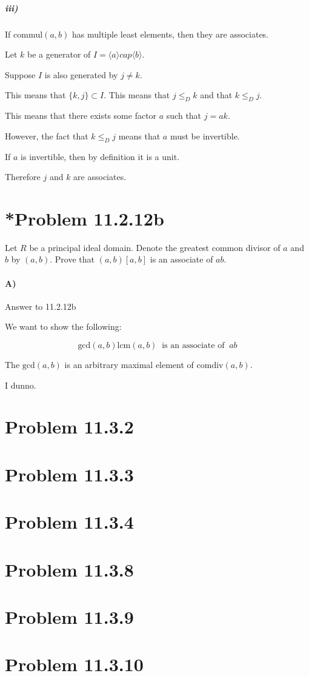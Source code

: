 \documentclass[10pt,letter]{article}
\begin{document}
\subparagraph{iii)} If $\text{commul}(a, b)$ has multiple least elements, then they are associates.

Let $k$ be a generator of $I = \langle a \rangle cap \langle b \rangle$.

Suppose $I$ is also generated by $j \ne k$.

This means that $\{k, j\} \subset I $. This means that $j \le_D k$ and that $k \le_D j$.

This means that there exists some factor $a$ such that $j = ak$.

However, the fact that $k \le_D j$ means that $a$ must be invertible.

If $a$ is invertible, then by definition it is a unit.

Therefore $j$ and $k$ are associates. 

\section{*Problem 11.2.12b}

Let $R$ be a principal ideal domain. Denote the greatest common divisor of $a$ and $b$ by $(a, b)$. Prove that $(a, b)[a,b]$ is an associate of $ab$.

\paragraph{A)} Answer to 11.2.12b

We want to show the following:

$$ \text{gcd}(a,b)\text{lcm}(a,b) \;\;\text{is an associate of}\;\; ab $$

The $\text{gcd}(a,b)$ is an arbitrary maximal element of $\text{comdiv}(a, b)$.

I dunno.

 
\section*{Problem 11.3.2}

\section*{Problem 11.3.3}

\section*{Problem 11.3.4}

\section*{Problem 11.3.8}

\section*{Problem 11.3.9}

\section*{Problem 11.3.10}
\end{document}
